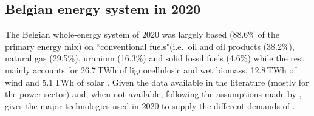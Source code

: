 \documentclass[11pt,twoside,a4paper,english]{article}
\def\ie{i.e.\ }
\def\og{``}
\def\fg{"}
\begin{document}
\begin{appendices}
\section{Belgian energy system in 2020}
\label{sec:app:bel_2020}The Belgian whole-energy system of 2020 was largely based (88.6\% of the primary energy mix) on \og conventional fuels\fg (\ie oil and oil products (38.2\%), natural gas (29.5\%), uranium (16.3\%) and solid fossil fuels (4.6\%) while the rest mainly accounts for 26.7\,TWh of lignocellulosic and wet biomass, 12.8\,TWh of wind and 5.1\,TWh of solar \cite{spf_economy_2022}. Given the data available in the literature (mostly for the power sector) and, when not available, following the assumptions made by \citet{Limpens2020},  gives the major technologies used in 2020 to supply the different demands of .


\end{appendices}
\end{document}
